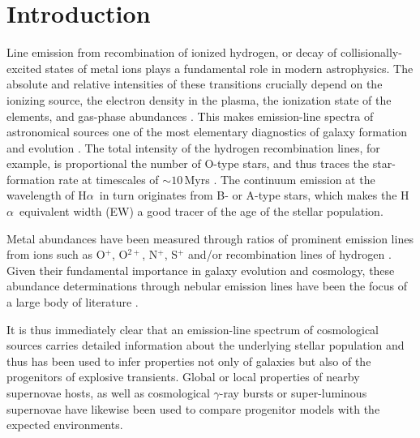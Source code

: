 \documentclass[traditabstract]{aa}
\newcommand{\ha}{H$\alpha$}
\begin{document}
\maketitle

\section{Introduction}
\label{sec:Intro}

Line emission from recombination of ionized hydrogen, or decay of collisionally-excited states of metal ions plays a fundamental role in modern astrophysics. The absolute and relative intensities of these transitions crucially depend on the ionizing source, the electron density in the plasma, the ionization state of the elements, and gas-phase abundances \citep{1989agna.book.....O}. This makes emission-line spectra of astronomical sources one of the most elementary diagnostics of galaxy formation and evolution \citep[e.g.][]{2004ApJ...613..898T, 2006ApJ...644..813E, 2009ApJ...706.1364F}. The total intensity of the hydrogen recombination lines, for example, is proportional the number of O-type stars, and thus traces the star-formation rate at timescales of $\sim10$\,Myrs \citep[e.g.][]{1998ARA&A..36..189K}. The continuum emission at the wavelength of \ha\, in turn originates from B- or A-type stars, which makes the \ha\, equivalent width (EW) a good tracer of the age of the stellar population.

Metal abundances have been measured through ratios of prominent emission lines from ions such as O$^{+}$, O$^{2+}$, N$^{+}$, S$^{+}$ and/or recombination lines of hydrogen \citep{1979MNRAS.189...95P, 1979A&A....78..200A}. Given their fundamental importance in galaxy evolution and cosmology, these abundance determinations through nebular emission lines have been the focus of a large body of literature \citep[e.g.][]{2004ApJ...617..240K, 2005ApJ...631..231P, 2006A&A...454L.127S, 2006A&A...448..955I, 2008ApJ...681.1183K}.

It is thus immediately clear that an emission-line spectrum of cosmological sources carries detailed information about the underlying stellar population and thus has been used to infer properties not only of galaxies but also of the progenitors of explosive transients. Global \citep[e.g.][]{2008ApJ...673..999P, 2011MNRAS.412.1441L} or local \citep[e.g.][]{2010MNRAS.407.2660A, 2011ApJ...731L...4M, 2011A&A...530A..95L} properties of nearby supernovae hosts, as well as cosmological $\gamma$-ray bursts \citep[e.g.][]{2007A&A...464..529W, 2012A&A...546A...8K, 2013ApJ...774..119G} or super-luminous supernovae \citep[e.g.][]{2013ApJ...763L..28C, 2014ApJ...787..138L, 2014arXiv1409.8331L, 2016arXiv160408207P} have likewise been used to compare progenitor models with the expected environments. 
\end{document}
